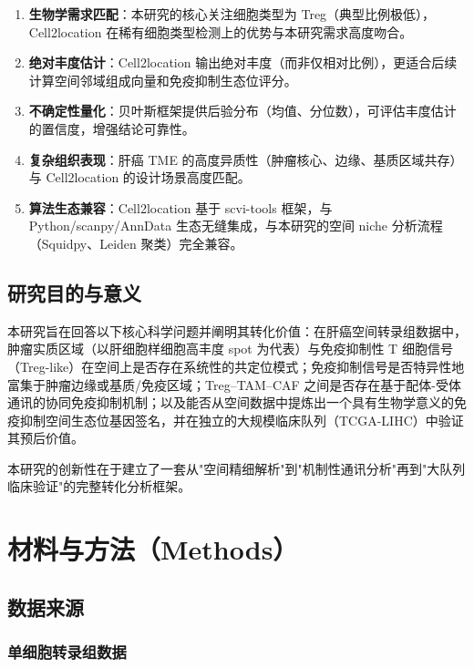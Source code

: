 \documentclass[12pt, a4paper]{ctexart}
\begin{document}
\begin{enumerate}[label=\textbf{（\arabic*）}]
    \item \textbf{生物学需求匹配}：本研究的核心关注细胞类型为 Treg（典型比例极低），Cell2location 在稀有细胞类型检测上的优势与本研究需求高度吻合。
    \item \textbf{绝对丰度估计}：Cell2location 输出绝对丰度（而非仅相对比例），更适合后续计算空间邻域组成向量和免疫抑制生态位评分。
    \item \textbf{不确定性量化}：贝叶斯框架提供后验分布（均值、分位数），可评估丰度估计的置信度，增强结论可靠性。
    \item \textbf{复杂组织表现}：肝癌 TME 的高度异质性（肿瘤核心、边缘、基质区域共存）与 Cell2location 的设计场景高度匹配。
    \item \textbf{算法生态兼容}：Cell2location 基于 scvi-tools 框架，与 Python/scanpy/AnnData 生态无缝集成，与本研究的空间 niche 分析流程（Squidpy、Leiden 聚类）完全兼容。
\end{enumerate}

\subsection{研究目的与意义}

本研究旨在回答以下核心科学问题并阐明其转化价值：在肝癌空间转录组数据中，肿瘤实质区域（以肝细胞样细胞高丰度 spot 为代表）与免疫抑制性 T 细胞信号（Treg-like）在空间上是否存在系统性的共定位模式；免疫抑制信号是否特异性地富集于肿瘤边缘或基质/免疫区域；Treg--TAM--CAF 之间是否存在基于配体-受体通讯的协同免疫抑制机制；以及能否从空间数据中提炼出一个具有生物学意义的免疫抑制空间生态位基因签名，并在独立的大规模临床队列（TCGA-LIHC）中验证其预后价值。

本研究的创新性在于建立了一套从"空间精细解析"到"机制性通讯分析"再到"大队列临床验证"的完整转化分析框架。

\section{材料与方法（Methods）}

\subsection{数据来源}

\subsubsection{单细胞转录组数据}
\end{document}
